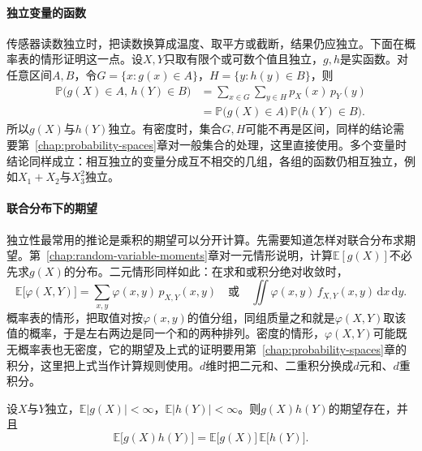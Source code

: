 \paragraph{独立变量的函数}
传感器读数独立时，把读数换算成温度、取平方或截断，结果仍应独立。下面在概率表的情形证明这一点。设$X,Y$只取有限个或可数个值且独立，$g,h$是实函数。对任意区间$A,B$，令$G=\{x:g(x)\in A\}$，$H=\{y:h(y)\in B\}$，则
\[
 \begin{aligned}
 \mathbb{P}\bigl(g(X)\in A,\,h(Y)\in B\bigr)&=\sum_{x\in G}\sum_{y\in H}p_X(x)\,p_Y(y)\\
 &=\mathbb{P}\bigl(g(X)\in A\bigr)\,\mathbb{P}\bigl(h(Y)\in B\bigr).
 \end{aligned}
\]
所以$g(X)$与$h(Y)$独立。有密度时，集合$G,H$可能不再是区间，同样的结论需要第~\ref{chap:probability-spaces}章对一般集合的处理，这里直接使用。多个变量时结论同样成立：相互独立的变量分成互不相交的几组，各组的函数仍相互独立，例如$X_1+X_2$与$X_3^{2}$独立。

\paragraph{联合分布下的期望}
独立性最常用的推论是乘积的期望可以分开计算。先需要知道怎样对联合分布求期望。第~\ref{chap:random-variable-moments}章对一元情形说明，计算$\mathbb{E}[g(X)]$不必先求$g(X)$的分布。二元情形同样如此：在求和或积分绝对收敛时，
\begin{equation}
 \mathbb{E}\bigl[\varphi(X,Y)\bigr]=\sum_{x,y}\varphi(x,y)\,p_{X,Y}(x,y)
 \quad\text{或}\quad
 \iint\varphi(x,y)\,f_{X,Y}(x,y)\,\mathrm{d}x\,\mathrm{d}y .
 \label{eq:rvc-joint-expectation}
\end{equation}
概率表的情形，把取值对按$\varphi(x,y)$的值分组，同组质量之和就是$\varphi(X,Y)$取该值的概率，于是左右两边是同一个和的两种排列。密度的情形，$\varphi(X,Y)$可能既无概率表也无密度，它的期望及上式的证明要用第~\ref{chap:probability-spaces}章的积分，这里把上式当作计算规则使用。$d$维时把二元和、二重积分换成$d$元和、$d$重积分。

\begin{theorem}[独立变量乘积的期望]
\label{thm:rvc-product-expectation}
设$X$与$Y$独立，$\mathbb{E}\lvert g(X)\rvert<\infty$，$\mathbb{E}\lvert h(Y)\rvert<\infty$。则$g(X)h(Y)$的期望存在，并且
\begin{equation}
 \mathbb{E}\bigl[g(X)h(Y)\bigr]=\mathbb{E}\bigl[g(X)\bigr]\,\mathbb{E}\bigl[h(Y)\bigr].
 \label{eq:rvc-product-expectation}
\end{equation}
\end{theorem}

